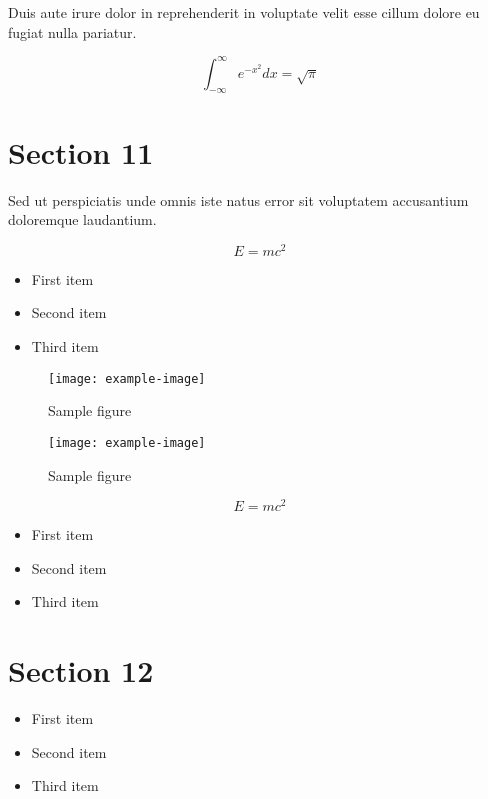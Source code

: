 \documentclass{article}
\begin{document}
Duis aute irure dolor in reprehenderit in voluptate velit esse cillum dolore eu fugiat nulla pariatur.

\begin{equation}
    \int_{-\infty}^{\infty} e^{-x^2} dx = \sqrt{\pi}
\end{equation}

\section{Section 11}

Sed ut perspiciatis unde omnis iste natus error sit voluptatem accusantium doloremque laudantium.

\begin{equation}
    E = mc^2
\end{equation}


\begin{itemize}
\item First item
\item Second item
\item Third item
\end{itemize}

\begin{figure}[h]
    \centering
    \texttt{[image: example-image]}
    \caption{Sample figure}
    \label{fig:sample}
\end{figure}

\begin{figure}[h]
    \centering
    \texttt{[image: example-image]}
    \caption{Sample figure}
    \label{fig:sample}
\end{figure}

\begin{equation}
    E = mc^2
\end{equation}


\begin{itemize}
\item First item
\item Second item
\item Third item
\end{itemize}

\section{Section 12}

\begin{itemize}
\item First item
\item Second item
\item Third item
\end{itemize}
\end{document}
